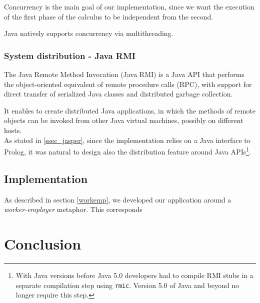 \documentclass[a4paper, 11pt, oneside]{elsarticle}
\begin{document}
Concurrency is the main goal of our implementation, since we want the execution of the first phase of the calculus to be independent from the second.

Java natively supports concurrency via multithreading.


\subsubsection{System distribution - Java RMI}

The Java Remote Method Invocation (Java RMI) is a Java API that performs the object-oriented equivalent of remote procedure calls (RPC), with support for direct transfer of serialized Java classes and distributed garbage collection.\cite{wiki_rmi}

It enables to create distributed Java applications, in which the methods of remote objects can be invoked from other Java virtual machines, possibly on different hosts\cite{oracle_rmi}.\\

As stated in \ref{ssec_jasper}, since the implementation relies on a Java interface to Prolog, it was natural to design also the distribution feature around Java APIs\footnote{With Java versions before Java 5.0 developers had to compile RMI stubs in a separate compilation step using \texttt{rmic}. Version 5.0 of Java and beyond no longer require this step.}.


\subsection{Implementation}

As described in section \ref{workemp}, we developed our application around a \emph{worker-employer} metaphor.
This corresponds

\section{Conclusion}



\newpage



\end{document}
